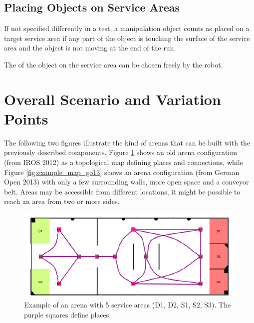 \subsection{Placing Objects on Service Areas} \label{ssec:PlacingObjects}
If not specified differently in a test, a manipulation object counts as placed on a target service area if any part of the object is touching the surface of the service area and the object is not moving at the end of the run.
\par
The  of the object on the service area can be chosen freely by the robot.

\section{Overall Scenario and Variation Points}
The following two figures illustrate the kind of arenas that can be built with the previously described components. Figure \ref{fig:example_map} shows an old arena configuration (from IROS 2012) as a topological map defining places and connections, while Figure \ref{fig:example_map_go13} shows an arena configuration (from German Open 2013) with only a few surrounding walls, more open space and a conveyor belt. 
Areas may be accessible from different locations, it might be possible to reach an area from two or more sides.

\begin{figure}
\includegraphics[width= \textwidth ]{../images/example_map.png}
\caption{Example of an arena with 5 service areas (D1, D2, S1, S2, S3). The purple squares define places.}
\label{fig:example_map}
\end{figure}

